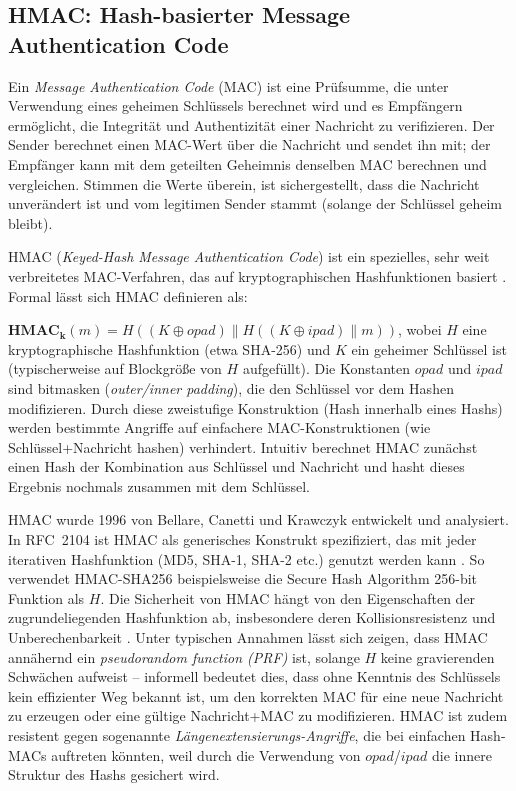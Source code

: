 \subsection{HMAC: Hash-basierter Message Authentication Code}

Ein \textit{Message Authentication Code} (MAC) ist eine Prüfsumme, die unter Verwendung eines geheimen Schlüssels berechnet wird und es Empfängern ermöglicht, die Integrität und Authentizität einer Nachricht zu verifizieren. Der Sender berechnet einen MAC-Wert über die Nachricht und sendet ihn mit; der Empfänger kann mit dem geteilten Geheimnis denselben MAC berechnen und vergleichen. Stimmen die Werte überein, ist sichergestellt, dass die Nachricht unverändert ist und vom legitimen Sender stammt (solange der Schlüssel geheim bleibt).

HMAC (\textit{Keyed-Hash Message Authentication Code}) ist ein spezielles, sehr weit verbreitetes MAC-Verfahren, das auf kryptographischen Hashfunktionen basiert \cite{RFC2104}. Formal lässt sich HMAC definieren als: 

$\mathbf{HMAC_{k}}(m)=H((K⊕opad)∥H((K⊕ipad)∥m))$, wobei $H$ eine kryptographische Hashfunktion (etwa SHA-256) und $K$ ein geheimer Schlüssel ist (typischerweise auf Blockgröße von $H$ aufgefüllt). Die Konstanten $opad$ und $ipad$ sind bitmasken (\textit{outer/inner padding}), die den Schlüssel vor dem Hashen modifizieren. Durch diese zweistufige Konstruktion (Hash innerhalb eines Hashs) werden bestimmte Angriffe auf einfachere MAC-Konstruktionen (wie \glqq Schlüssel+Nachricht hashen\grqq) verhindert. Intuitiv berechnet HMAC zunächst einen Hash der Kombination aus Schlüssel und Nachricht und hasht dieses Ergebnis nochmals zusammen mit dem Schlüssel.

HMAC wurde 1996 von Bellare, Canetti und Krawczyk entwickelt und analysiert. In RFC 2104 ist HMAC als generisches Konstrukt spezifiziert, das mit jeder iterativen Hashfunktion (MD5, SHA-1, SHA-2 etc.) genutzt werden kann \cite{RFC2104}. So verwendet HMAC-SHA256 beispielsweise die Secure Hash Algorithm 256-bit Funktion als $H$. Die Sicherheit von HMAC hängt von den Eigenschaften der zugrundeliegenden Hashfunktion ab, insbesondere deren Kollisionsresistenz und Unberechenbarkeit \cite{RFC2104}. Unter typischen Annahmen lässt sich zeigen, dass HMAC annähernd ein \textit{pseudorandom function (PRF)} ist, solange $H$ keine gravierenden Schwächen aufweist – informell bedeutet dies, dass ohne Kenntnis des Schlüssels kein effizienter Weg bekannt ist, um den korrekten MAC für eine neue Nachricht zu erzeugen oder eine gültige Nachricht+MAC zu modifizieren. HMAC ist zudem resistent gegen sogenannte \textit{Längenextensierungs-Angriffe}, die bei einfachen Hash-MACs auftreten könnten, weil durch die Verwendung von $opad$/$ipad$ die innere Struktur des Hashs gesichert wird.

